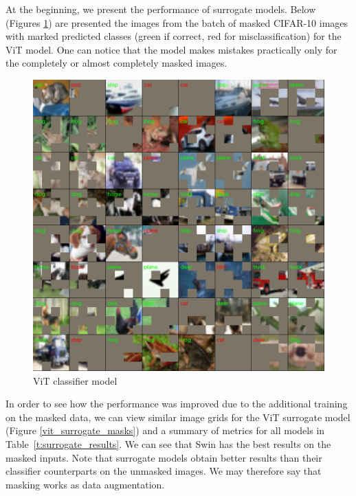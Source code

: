\documentclass[magisterska,en]{pracamgr}
\begin{document}
At the beginning, we present the performance of surrogate models. Below (Figures \ref{vit_classifier_masks}) are presented the images from the batch of masked CIFAR-10 images with marked predicted classes (green if correct, red for misclassification) for the ViT model. One can notice that the model makes mistakes practically only for the completely or almost completely masked images.

\begin{figure}[H]
\centering
\includegraphics[scale=0.5]{./images/vit_classifier_masks.png}
\caption{ViT classifier model}
\label{vit_classifier_masks}
\end{figure}



In order to see how the performance was improved due to the additional training on the masked data, we can view similar image grids for the ViT surrogate model (Figure \ref{vit_surrogate_masks}) and a summary of metrics for all models in Table~\ref{t:surrogate_results}. We can see that Swin has the best results on the masked inputs. Note that surrogate models obtain better results than their classifier counterparts on the unmasked images. We may therefore say that masking works as data augmentation.
\end{document}
